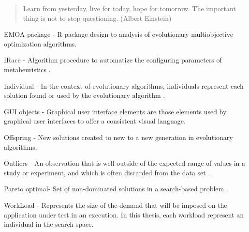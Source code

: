 \documentclass[espaco=umemeio,chapter=TITLE,twoside,openright]{abnt}
\begin{document}
\newcommand{\beleleu}{\textit{beleleu}}








\vspace*{\fill}
\begin{quote} 
\centering 
    Learn from yesterday, live for today, hope for tomorrow. The important thing is not to stop questioning. 
    (Albert Einstein)
\end{quote}

\vspace*{\fill}








\tableofcontents

\listoffigures

\listoftables




\begin{description}

\item EMOA package - R package design to  analysis of evolutionary multiobjective optimization algorithms.

\item IRace - Algorithm procedure to automatize the configuring parameters of metaheuristics \cite{ManuelLopez-IbanezJeremieDubois-LacosteLesliePerezCaceresMauroBirattari2016}.

\item Individual - In the context of evolutionary algorithms, individuals represent each solution found or used by the evolutionary algorithm \cite{GendreauMichelandPotvin2010}.

\item GUI objects - Graphical user interface elements are those elements used by graphical user interfaces to offer a consistent visual language. 

\item Offspring - New solutions created to new to a new generation in evolutionary algorithms\cite{GendreauMichelandPotvin2010}.

\item Outliers - An observation that is well outside of the expected range of values in a study or experiment, and which is often discarded from the data set \cite{GendreauMichelandPotvin2010}.

\item Pareto optimal-  Set of non-dominated solutions in a search-based problem \cite{deb2001multi}.

\item WorkLoad - Represents the size of the demand that will be imposed on the application under test in an execution. In this thesis, each workload represent an individual in the search space.


\end{description}
\end{document}
